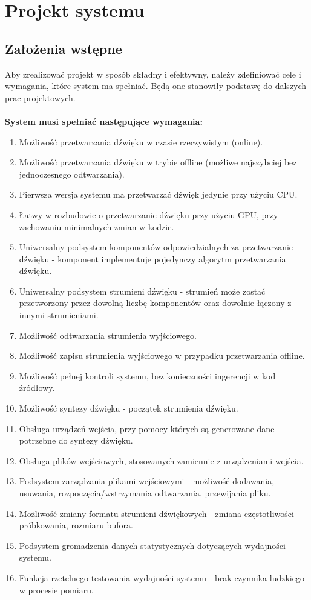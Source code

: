 \chapter{Projekt systemu}

\section{Założenia wstępne}
Aby zrealizować projekt w sposób składny i efektywny, należy zdefiniować cele i wymagania, które system ma spełniać. Będą one stanowiły podstawę do dalszych prac projektowych.
\\\\
\textbf{System musi spełniać następujące wymagania:}
\begin{enumerate}
    \item Możliwość przetwarzania dźwięku w czasie rzeczywistym (online).
    \item Możliwość przetwarzania dźwięku w trybie offline (możliwe najszybciej bez jednoczesnego odtwarzania).
    \item Pierwsza wersja systemu ma przetwarzać dźwięk jedynie przy użyciu CPU.
    \item Łatwy w rozbudowie o przetwarzanie dźwięku przy użyciu GPU, przy zachowaniu minimalnych zmian w kodzie.
    \item Uniwersalny podsystem komponentów odpowiedzialnych za przetwarzanie dźwięku - komponent implementuje pojedynczy algorytm przetwarzania dźwięku.
    \item Uniwersalny podsystem strumieni dźwięku - strumień może zostać przetworzony przez dowolną liczbę komponentów oraz dowolnie łączony z innymi strumieniami.
    \item Możliwość odtwarzania strumienia wyjściowego.
    \item Możliwość zapisu strumienia wyjściowego w przypadku przetwarzania offline.
    \item Możliwość pełnej kontroli systemu, bez konieczności ingerencji w kod źródłowy.
    \item Możliwość syntezy dźwięku - początek strumienia dźwięku.
    \item Obsługa urządzeń wejścia, przy pomocy których są generowane dane potrzebne do syntezy dźwięku.
    \item Obsługa plików wejściowych, stosowanych zamiennie z urządzeniami wejścia.
    \item Podsystem zarządzania plikami wejściowymi - możliwość dodawania, usuwania, rozpoczęcia/wstrzymania odtwarzania, przewijania pliku.
    \item Możliwość zmiany formatu strumieni dźwiękowych - zmiana częstotliwości próbkowania, rozmiaru bufora.
    \item Podsystem gromadzenia danych statystycznych dotyczących wydajności systemu.
    \item Funkcja rzetelnego testowania wydajności systemu - brak czynnika ludzkiego w procesie pomiaru.
\end{enumerate}

